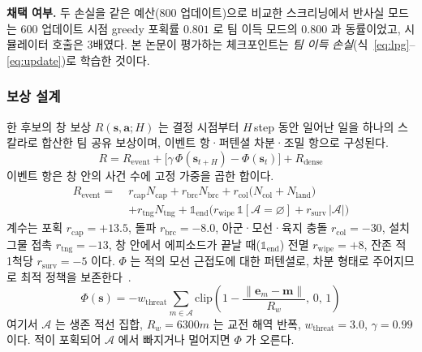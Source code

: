 \textbf{채택 여부.} 두 손실을 같은 예산(800 업데이트)으로 비교한 스크리닝에서 반사실
모드는 600 업데이트 시점 greedy 포획률 $0.801$ 로 팀 이득 모드의 $0.800$ 과 동률이었고,
시뮬레이터 호출은 3배였다. 본 논문이 평가하는 체크포인트는 \emph{팀 이득
손실}(식~\eqref{eq:lpg}--\eqref{eq:update})로 학습한 것이다.

\subsubsection{보상 설계}
\label{sec:reward}

한 후보의 창 보상 $R(\mathbf{s}, \mathbf{a}; H)$ 는 결정 시점부터 $H$\,step 동안 일어난
일을 하나의 스칼라로 합산한 팀 공유 보상이며, 이벤트 항·퍼텐셜 차분·조밀 항으로 구성된다.
\begin{equation}
R = R_\mathrm{event} + \big[\gamma\,\Phi(\mathbf{s}_{t+H}) - \Phi(\mathbf{s}_t)\big] + R_\mathrm{dense}
\label{eq:reward}
\end{equation}
이벤트 항은 창 안의 사건 수에 고정 가중을 곱한 합이다.
\begin{equation}
\begin{aligned}
R_\mathrm{event} = \;& r_{\mathrm{cap}} N_{\mathrm{cap}} + r_{\mathrm{brc}} N_{\mathrm{brc}}
  + r_{\mathrm{col}} \big(N_{\mathrm{col}} + N_{\mathrm{land}}\big)\\
  & + r_{\mathrm{tng}} N_{\mathrm{tng}}
  + \mathbb{1}_{\mathrm{end}}\big(r_{\mathrm{wipe}}\,\mathbb{1}[\mathcal{A} = \varnothing] + r_{\mathrm{surv}}\,|\mathcal{A}|\big)
\end{aligned}
\label{eq:revent}
\end{equation}
계수는 포획 $r_{\mathrm{cap}} = +13.5$, 돌파 $r_{\mathrm{brc}} = -8.0$, 아군·모선·육지 충돌
$r_{\mathrm{col}} = -30$, 설치 그물 접촉 $r_{\mathrm{tng}} = -13$, 창 안에서 에피소드가 끝날
때($\mathbb{1}_{\mathrm{end}}$) 전멸 $r_{\mathrm{wipe}} = +8$, 잔존 적 1척당 $r_{\mathrm{surv}} = -5$ 이다. $\Phi$ 는 적의
모선 근접도에 대한 퍼텐셜로, 차분 형태로 주어지므로 최적 정책을
보존한다~\citep{ng1999shaping}.
\begin{equation}
\Phi(\mathbf{s}) = -w_\mathrm{threat} \sum_{m \in \mathcal{A}}
          \mathrm{clip}\!\left(1 - \frac{\lVert \mathbf{e}_m - \mathbf{m} \rVert}{R_w},\, 0,\, 1\right)
\label{eq:potential}
\end{equation}
여기서 $\mathcal{A}$ 는 생존 적선 집합, $R_w = 6300\unit{m}$ 는 교전 해역 반폭,
$w_\mathrm{threat}=3.0$, $\gamma = 0.99$ 이다. 적이 포획되어 $\mathcal{A}$ 에서 빠지거나
멀어지면 $\Phi$ 가 오른다.

